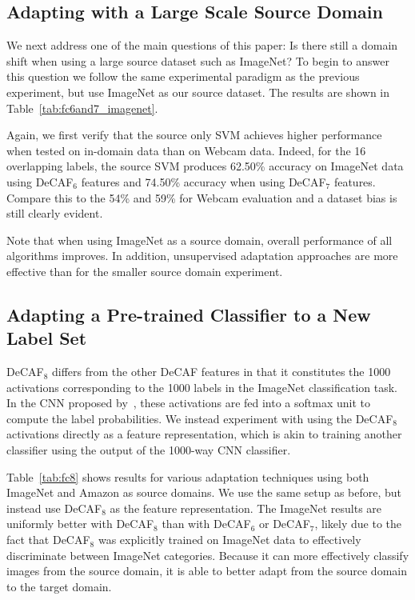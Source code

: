 \subsection{Adapting with a Large Scale Source Domain}

We next address one of the main questions of this paper: Is there still a domain shift when using a large source dataset such as ImageNet? To begin to answer this question we follow the same experimental paradigm as the previous experiment, but use ImageNet as our source dataset. 
The results are shown in Table~\ref{tab:fc6and7_imagenet}. %



Again, we first verify that the source only SVM achieves higher performance when tested on in-domain data than on Webcam data. 
Indeed, for the 16 overlapping labels, the source SVM produces 62.50\% accuracy on ImageNet data using DeCAF$_6$ features and 74.50\% accuracy when using DeCAF$_7$ features. 
Compare this to the 54\% and 59\% for Webcam evaluation and a dataset bias is still clearly evident.

Note that when using ImageNet as a source domain, overall performance of all algorithms improves. In addition, unsupervised adaptation approaches are more effective than for the smaller source domain experiment. 



\subsection{Adapting a Pre-trained Classifier to a New Label Set }



DeCAF$_8$ differs from the other DeCAF features in that it constitutes the 1000
activations corresponding to the 1000 labels in the ImageNet classification
task. In the CNN proposed by~\cite{supervision}, these activations are fed into
a softmax unit to compute the label probabilities. We instead experiment with
using the DeCAF$_8$ activations directly as a feature representation, which is
akin to training another classifier using the output of the 1000-way CNN
classifier.

Table~\ref{tab:fc8} shows results for various adaptation techniques using both %
ImageNet and Amazon as source domains. We use the same setup as before, but
instead use DeCAF$_8$ as the feature representation. 
The ImageNet results are uniformly better with DeCAF$_8$ than with DeCAF$_6$ or
DeCAF$_7$, likely due to the fact that DeCAF$_8$ was explicitly
trained on ImageNet data to effectively discriminate between ImageNet categories.
Because it can more
effectively classify images from the source domain, it is able to better adapt
from the source domain to the target domain.

